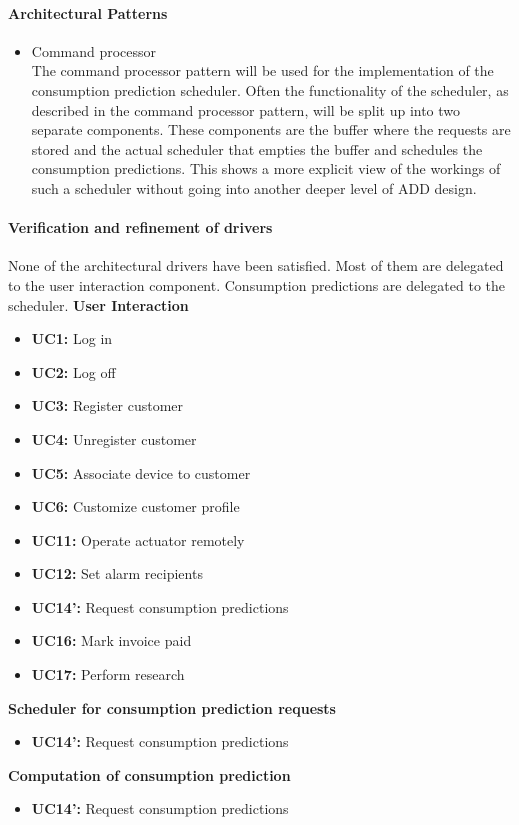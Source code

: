 \paragraph{Architectural Patterns}
\begin{itemize}
	\item Command processor \\
	The command processor pattern will be used for the implementation of the consumption prediction scheduler. Often the functionality of the scheduler, as described in the command processor pattern, will be split up into two separate components. 
	These components are the buffer where the requests are stored and the actual scheduler that empties the buffer and schedules the consumption predictions. This shows a more explicit view of the workings of such a scheduler without going into another deeper level of ADD design.
\end{itemize}


\paragraph{Verification and refinement of drivers}
None of the architectural drivers have been satisfied. Most of them are
	delegated to the user interaction component. Consumption predictions are delegated to the scheduler.
\textbf{User Interaction}
\begin{itemize}
	\item \textbf{UC1: } Log in
	\item \textbf{UC2: } Log off
	\item \textbf{UC3: } Register customer
	\item \textbf{UC4: } Unregister customer
	\item \textbf{UC5: } Associate device to customer
	\item \textbf{UC6: } Customize customer profile
	\item \textbf{UC11: } Operate actuator remotely
	\item \textbf{UC12: } Set alarm recipients
	\item \textbf{UC14': } Request consumption predictions
	\item \textbf{UC16: } Mark invoice paid
	\item \textbf{UC17: } Perform research
\end{itemize}
\textbf{Scheduler for consumption prediction requests}
\begin{itemize}
	\item \textbf{UC14': } Request consumption predictions
\end{itemize}
\textbf{Computation of consumption prediction}
\begin{itemize}
	\item \textbf{UC14': } Request consumption predictions
\end{itemize}
